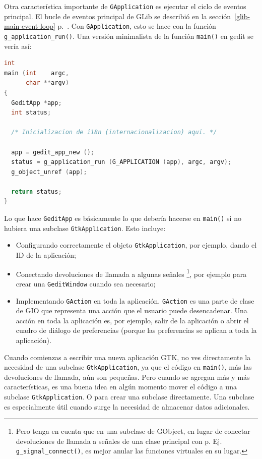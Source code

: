 Otra característica importante de \lstinline{GApplication} es ejecutar el ciclo de eventos principal. El bucle de eventos principal de GLib se describió en la sección~\ref{glib-main-event-loop} p.~\pageref{glib-main-event-loop}. Con \lstinline{GApplication}, esto se hace con la función \lstinline{g_application_run()}. Una versión minimalista de la función \lstinline{main()} en gedit se vería así:

\begin{lstlisting}[language=C]
int
main (int    argc,
      char **argv)
{
  GeditApp *app;
  int status;

  /* Inicializacion de i18n (internacionalizacion) aqui. */

  app = gedit_app_new ();
  status = g_application_run (G_APPLICATION (app), argc, argv);
  g_object_unref (app);

  return status;
}
\end{lstlisting}

Lo que hace \lstinline{GeditApp} es básicamente lo que debería hacerse en \lstinline{main()} si no hubiera una subclase \lstinline{GtkApplication}. Esto incluye:
\begin{itemize}
  \item Configurando correctamente el objeto \lstinline{GtkApplication}, por ejemplo, dando el ID de la aplicación;
  \item Conectando devoluciones de llamada a algunas señales \footnote{Pero tenga en cuenta que en una subclase de GObject, en lugar de conectar devoluciones de llamada a señales de una clase principal con p. Ej. \lstinline{g_signal_connect()}, es mejor anular las funciones virtuales en su lugar.}, por ejemplo para crear una \lstinline{GeditWindow} cuando sea necesario;
  \item Implementando \lstinline{GAction} en toda la aplicación. \lstinline{GAction} es una parte de clase de GIO que representa una acción que el usuario puede desencadenar. Una acción en toda la aplicación es, por ejemplo, salir de la aplicación o abrir el cuadro de diálogo de preferencias (porque las preferencias se aplican a toda la aplicación).
\end{itemize}

Cuando comienzas a escribir una nueva aplicación GTK, no ves directamente la necesidad de una subclase \lstinline{GtkApplication}, ya que el código en \lstinline{main()}, más las devoluciones de llamada, aún son pequeñas. Pero cuando se agregan más y más características, es una buena idea en algún momento mover el código a una subclase \lstinline{GtkApplication}. O para crear una subclase directamente. Una subclase es especialmente útil cuando surge la necesidad de almacenar datos adicionales.

